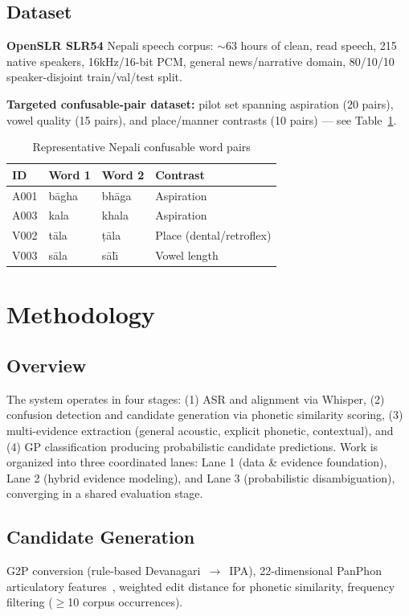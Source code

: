 \documentclass[10pt,conference]{IEEEtran}
\begin{document}
\subsection{Dataset}
\textbf{OpenSLR SLR54} Nepali speech corpus: $\sim$63 hours of clean,
read speech, 215 native speakers, 16kHz/16-bit PCM, general news/narrative
domain, 80/10/10 speaker-disjoint train/val/test split.

\textbf{Targeted confusable-pair dataset:} pilot set spanning aspiration
(20 pairs), vowel quality (15 pairs), and place/manner contrasts
(10 pairs) --- see Table~\ref{tab:pairs}.

\begin{table}[t]
\centering
\caption{Representative Nepali confusable word pairs}
\label{tab:pairs}
\begin{tabular}{@{}llll@{}}
\toprule
ID & Word 1 & Word 2 & Contrast \\
\midrule
A001 & b\={a}gha & bh\={a}ga & Aspiration \\
A003 & kala & khala & Aspiration \\
V002 & t\={a}la & \d{t}\={a}la & Place (dental/retroflex) \\
V003 & s\={a}la & s\={a}l\={\i} & Vowel length \\
\bottomrule
\end{tabular}
\end{table}

\section{Methodology}

\subsection{Overview}
The system operates in four stages: (1) ASR and alignment via Whisper,
(2) confusion detection and candidate generation via phonetic similarity
scoring, (3) multi-evidence extraction (general acoustic, explicit
phonetic, contextual), and (4) GP classification producing probabilistic
candidate predictions. Work is organized into three coordinated lanes:
Lane 1 (data \& evidence foundation), Lane 2 (hybrid evidence modeling),
and Lane 3 (probabilistic disambiguation), converging in a shared
evaluation stage.

\subsection{Candidate Generation}
G2P conversion (rule-based Devanagari~$\to$~IPA), 22-dimensional PanPhon
articulatory features~\cite{mortensen2016panphon}, weighted edit distance
for phonetic similarity, frequency filtering ($\geq$10 corpus occurrences).
\end{document}
